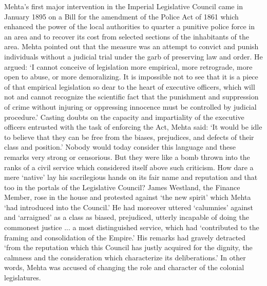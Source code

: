 \begin{multicols}{2}
Mehta's first major intervention in the Imperial Legislative Council came in January 1895 on a Bill for the amendment of the Police Act of 1861 which enhanced the power of the local authorities to quarter a punitive police force in an area and to recover its cost from selected sections of the inhabitants of the area. Mehta pointed out that the measure was an attempt to convict and punish individuals without a judicial trial under the garb of preserving law and order. He argued: `I cannot conceive of legislation more empirical, more retrograde, more open to abuse, or more demoralizing. It is impossible not to see that it is a piece of that empirical legislation so dear to the heart of executive officers, which will not and cannot recognize the scientific fact that the punishment and suppression of crime without injuring or oppressing innocence must be controlled by judicial procedure.' Casting doubts on the capacity and impartiality of the executive officers entrusted with the task of enforcing the Act, Mehta said: `It would be idle to believe that they can be free from the biases, prejudices, and defects of their class and position.' Nobody would today consider this language and these remarks very strong or censorious. But they were like a bomb thrown into the ranks of a civil service which considered itself above such criticism. How dare a mere `native' lay his sacrilegious hands on its fair name and reputation and that too in the portals of the Legislative Council? James Westland, the Finance Member, rose in the house and protested against `the new spirit' which Mehta `had introduced into the Council.' He had moreover uttered `calumnies' against and `arraigned' as a class as biased, prejudiced, utterly incapable of doing the commonest justice ... a most distinguished service, which had `contributed to the framing and consolidation of the Empire.' His remarks had gravely detracted `from the reputation which this Council has justly acquired for the dignity, the calmness and the consideration which characterize its deliberations.' In other words, Mehta was accused of changing the role and character of the colonial legislatures.


\end{multicols}

